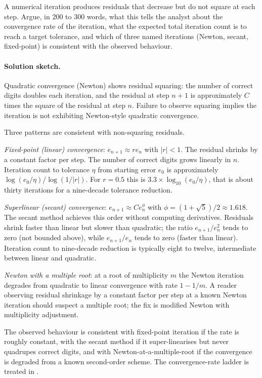\begin{exercise}
A numerical iteration produces residuals that decrease but do not
square at each step. Argue, in 200 to 300 words, what this tells the
analyst about the convergence rate of the iteration, what the
expected total iteration count is to reach a target tolerance, and
which of three named iterations (Newton, secant, fixed-point) is
consistent with the observed behaviour.

\paragraph{Solution sketch.} Quadratic convergence (Newton) shows
residual squaring: the number of correct digits doubles each
iteration, and the residual at step $n+1$ is approximately $C$ times
the square of the residual at step $n$. Failure to observe squaring
implies the iteration is not exhibiting Newton-style quadratic
convergence.

Three patterns are consistent with non-squaring residuals.

\textit{Fixed-point (linear) convergence}: $e_{n+1} \approx r e_{n}$
with $|r| < 1$. The residual shrinks by a constant factor per step.
The number of correct digits grows linearly in $n$. Iteration count
to tolerance $\eta$ from starting error $e_{0}$ is approximately
$\log(e_{0}/\eta) / \log(1/|r|)$. For $r = 0.5$ this is $3.3 \times
\log_{10}(e_{0}/\eta)$, that is about thirty iterations for a
nine-decade tolerance reduction.

\textit{Superlinear (secant) convergence}: $e_{n+1} \approx C
e_{n}^{\phi}$ with $\phi = (1 + \sqrt 5)/2 \approx 1.618$. The
secant method achieves this order without computing derivatives.
Residuals shrink faster than linear but slower than quadratic; the
ratio $e_{n+1}/e_{n}^{2}$ tends to zero (not bounded above), while
$e_{n+1}/e_{n}$ tends to zero (faster than linear). Iteration count
to nine-decade reduction is typically eight to twelve, intermediate
between linear and quadratic.

\textit{Newton with a multiple root}: at a root of multiplicity $m$
the Newton iteration degrades from quadratic to linear convergence
with rate $1 - 1/m$. A reader observing residual shrinkage by a
constant factor per step at a known Newton iteration should suspect
a multiple root; the fix is modified Newton with multiplicity
adjustment.

The observed behaviour is consistent with fixed-point iteration if
the rate is roughly constant, with the secant method if it
super-linearises but never quadrupes correct digits, and with
Newton-at-a-multiple-root if the convergence is degraded from a
known second-order scheme. The convergence-rate ladder is treated
in \cite{text:v2ch04-hairer-wanner-2008}.
\end{exercise}

